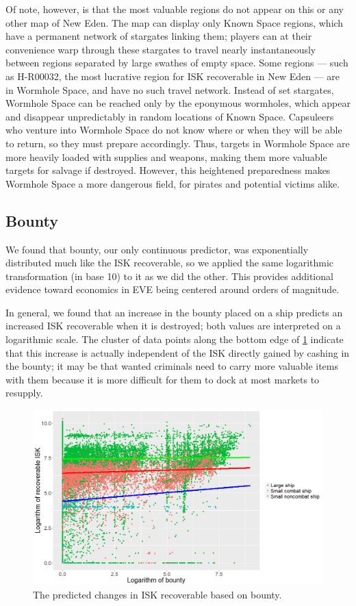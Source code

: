 \documentclass[letterpaper,12pt,article]{memoir}
\begin{document}
Of note, however, is that the most valuable regions do not appear on this
or any other map of New Eden. The map can display only Known Space regions, which
have a permanent network of stargates linking them; players can at their 
convenience warp through these stargates to travel nearly instantaneously between
regions separated by large swathes of empty space. Some regions --- such as H-R00032,
the most lucrative region for ISK recoverable in New Eden --- are in Wormhole
Space, and have no such travel network. Instead of set stargates, Wormhole Space
can be reached only by the eponymous wormholes, which appear and disappear
unpredictably in random locations of Known Space. Capsuleers who venture into
Wormhole Space do not know where or when they will be able to return, so they must
prepare accordingly. Thus, targets in Wormhole Space are more heavily loaded with
supplies and weapons, making them more valuable targets for salvage if destroyed.
However, this heightened preparedness makes Wormhole Space a more dangerous field, 
for pirates and potential victims alike.

\subsection{Bounty}

We found that bounty, our only continuous predictor, was exponentially distributed
much like the ISK recoverable, so we applied the same logarithmic transformation
(in base 10) to it as we did the other. This provides additional evidence toward
economics in EVE being centered around orders of magnitude.

In general, we found that an increase in the bounty placed on a ship predicts an
increased ISK recoverable when it is destroyed; both values are interpreted on a
logarithmic scale. The cluster of data points along the bottom edge of
\cref{fig:bounty} indicate that this increase is actually independent of the ISK
directly gained by cashing in the bounty; it may be that wanted criminals need to
carry more valuable items with them because it is more difficult for them to dock
at most markets to resupply.

\begin{figure}[ht]
    \centering
    \includegraphics[width=4.5in]{bountyPredPlot_legend.png}
    \caption{The predicted changes in ISK recoverable based on bounty.}
    \label{fig:bounty}
\end{figure}
\end{document}

